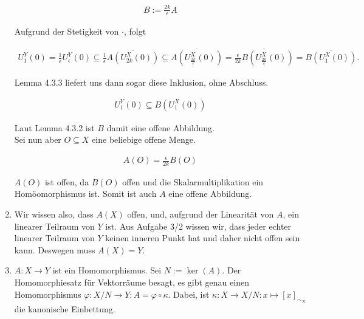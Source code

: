 \begin{solution}
\begin{enumerate}[label = (\roman*)]
  \begin{align*}
    B := \frac{2k}{\epsilon} A
  \end{align*}

  Aufgrund der Stetigkeit von $\cdot$, folgt

  \begin{align*}
    U_1^Y(0)
    =
    \frac{1}{\epsilon} U_{\epsilon}^Y(0)
    \subseteq
    \frac{1}{\epsilon} \overline{A(U_{2k}^X(0))}
    \subseteq
    \overline{A(U_{\frac{2k}{\epsilon}}^X(0))}
    = \overline{\frac{\epsilon}{2k}B(U_{\frac{2k}{\epsilon}}^X(0))}
    =
    \overline{B(U_{1}^X(0))}.
  \end{align*}

  Lemma 4.3.3 liefert uns dann sogar diese Inklusion, ohne Abschluss.

  \begin{align*}
    U_1^Y(0) \subseteq B(U_{1}^X(0))
  \end{align*}

  Laut Lemma 4.3.2 ist $B$ damit eine offene Abbildung. \\

  Sei nun aber $O \subseteq X$ eine beliebige offene Menge.

  \begin{align*}
    A(O)
    =
    \frac{\epsilon}{2k}B(O)
  \end{align*}

  $A(O)$ ist offen, da $B(O)$ offen und die Skalarmultiplikation ein Homöomorphismus ist.
  Somit ist auch $A$ eine offene Abbildung.

  \item
  Wir wissen also, dass $A(X)$ offen, und, aufgrund der Linearität von $A$, ein linearer Teilraum von $Y$ ist.
  Aus Aufgabe 3/2 wissen wir, dass jeder echter linearer Teilraum von $Y$ keinen inneren Punkt hat und
  daher nicht offen sein kann.
  Deswegen muss $A(X) = Y$.

  \item
  $A: X \to Y$ ist ein Homomorphismus.
  Sei $N := \ker(A)$.
  Der Homomorphiesatz für Vektorräume besagt, es gibt genau einen Homomorphismus $\varphi: X/N \to Y: A = \varphi \circ \kappa$.
  Dabei, ist $\kappa: X \rightarrow X/N: x \mapsto [x]_{\sim_N}$ die kanonische Einbettung.

  \begin{center}
   \\
  \end{center}


\end{enumerate}
\end{solution}
